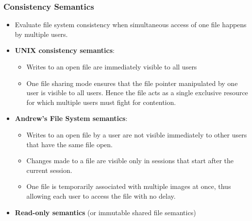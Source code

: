 \documentclass{article}
\theoremstyle{plain}
\theoremstyle{definition}
\begin{document}
\subsubsection{Consistency Semantics}
\begin{itemize}
    \item Evaluate file system consistency when simultaneous access of one file happens by multiple users. 
    
    \item \textbf{UNIX consistency semantics}:
    \begin{itemize}
        \item Writes to an open file are immediately visible to all users
        
        \item One file sharing mode ensures that the file pointer manipulated by one user is visible to all users. Hence the file acts as a single exclusive resource for which multiple users must fight for contention.
    \end{itemize}
    
    \item \textbf{Andrew's File System semantics}:
    \begin{itemize}
        \item Writes to an open file by a user are not visible immediately to other users that have the same file open.
        
        \item Changes made to a file are visible only in sessions that start after the current session. 
        
        \item One file is temporarily associated with multiple images at once, thus allowing each user to access the file with no delay. 
    \end{itemize}
    
    \item \textbf{Read-only semantics} (or immutable shared file semantics)
\end{itemize}
\end{document}
